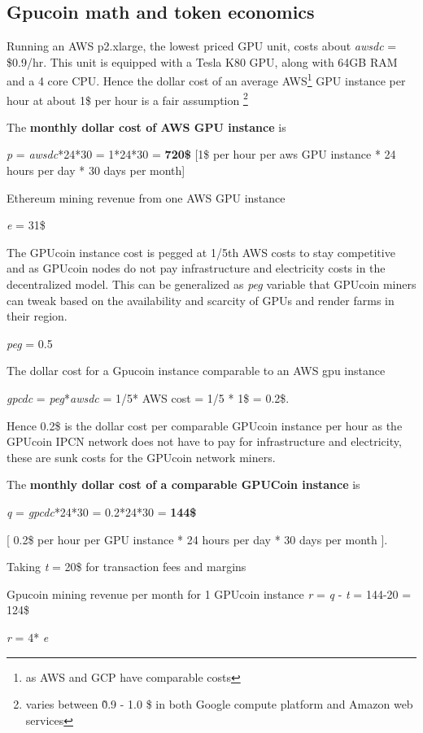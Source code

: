 \subsection{Gpucoin math and token economics}
Running an AWS p2.xlarge, the lowest priced GPU unit, costs about \emph{awsdc} = \$0.9/hr. This unit is equipped with a Tesla K80 GPU, along with 64GB RAM and a 4 core CPU. 
Hence the dollar cost of an average AWS\footnote{as AWS and GCP have comparable costs} GPU instance per hour at about 1\$ per hour is a fair assumption \footnote{ varies between \~ 0.9 - 1.0 \$ in both Google compute platform and Amazon web services}

The \textbf{monthly dollar cost of AWS GPU instance} is

\emph{p} = \emph{awsdc}*24*30 = 1*24*30 = \textbf{720\$  } [1\$ per hour per aws GPU instance * 24 hours per day * 30 days per month]

Ethereum mining revenue from one AWS GPU instance

\emph{e} = 31\$

The GPUcoin instance cost is pegged at 1/5th AWS costs to stay competitive and as GPUcoin nodes do not pay infrastructure and electricity costs in the decentralized model. This can be generalized as \emph{peg} variable that GPUcoin miners can tweak based on the availability and scarcity of GPUs and render farms in their region.

\emph{peg} = 0.5

The dollar cost for a Gpucoin instance comparable to an AWS gpu instance 

\emph{gpcdc} = \emph{peg}*\emph{awsdc} =  1/5* AWS cost = 1/5 * 1\$ = 0.2\$.

Hence 0.2\$ is the dollar cost per comparable GPUcoin instance per hour as the GPUcoin IPCN network does not have to pay for infrastructure and electricity, these are sunk costs for the GPUcoin network miners.

The \textbf{monthly dollar cost of a comparable GPUCoin instance} is 

\emph{q} = \emph{gpcdc}*24*30 = 0.2*24*30 = \textbf{144\$ }

[ 0.2\$ per hour per GPU instance * 24 hours per day * 30 days per month ].


Taking \emph{t} = 20\$ for transaction fees and margins

Gpucoin mining revenue per month for 1 GPUcoin instance
\emph{r} = \emph{q} - \emph{t} = 144-20 = 124\$

\emph{r} = 4* \emph{e} 

